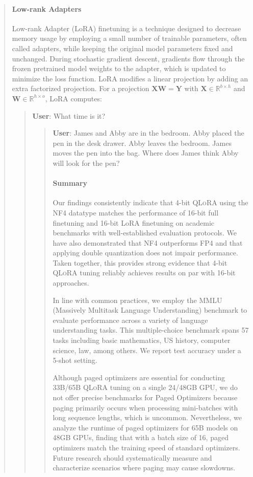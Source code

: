 \begin{quote}
\paragraph{Low-rank Adapters} Low-rank Adapter (LoRA) finetuning \citep{hu2021lora} is a technique designed to decrease memory usage by employing a small number of trainable parameters, often called adapters, while keeping the original model parameters fixed and unchanged. During stochastic gradient descent, gradients flow through the frozen pretrained model weights to the adapter, which is updated to minimize the loss function. LoRA modifies a linear projection by adding an extra factorized projection. For a projection ${\mathbf{X} \mathbf{W} = \mathbf{Y}}$ with $\mathbf{X}\in  \mathbb{R}^{b\times h}$ and $\mathbf{W}\in  \mathbb{R}^{h\times o}$, LoRA computes:

\begin{quote}
    \textbf{User}: What time is it?

\begin{quote}
    \textbf{User}: James and Abby are in the bedroom. Abby placed the pen in the desk drawer. Abby leaves the bedroom. James moves the pen into the bag. Where does James think Abby will look for the pen?

\paragraph{Summary} Our findings consistently indicate that 4-bit \textsc{QLoRA} using the NF4 datatype matches the performance of 16-bit full finetuning and 16-bit LoRA finetuning on academic benchmarks with well-established evaluation protocols. We have also demonstrated that NF4 outperforms FP4 and that applying double quantization does not impair performance. Taken together, this provides strong evidence that 4-bit \textsc{QLoRA} tuning reliably achieves results on par with 16-bit approaches.

In line with common practices, we employ the MMLU (Massively Multitask Language Understanding) benchmark \citep{hendrycksmeasuring} to evaluate performance across a variety of language understanding tasks. This multiple-choice benchmark spans 57 tasks including basic mathematics, US history, computer science, law, among others. We report test accuracy under a 5-shot setting.

Although paged optimizers are essential for conducting 33B/65B \textsc{QLoRA} tuning on a single 24/48GB GPU, we do not offer precise benchmarks for Paged Optimizers because paging primarily occurs when processing mini-batches with long sequence lengths, which is uncommon. Nevertheless, we analyze the runtime of paged optimizers for 65B models on 48GB GPUs, finding that with a batch size of 16, paged optimizers match the training speed of standard optimizers. Future research should systematically measure and characterize scenarios where paging may cause slowdowns.


\end{quote}
\end{quote}
\end{quote}
